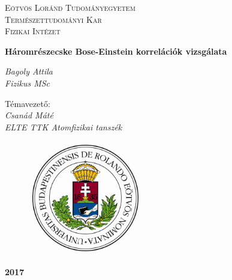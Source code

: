 \documentclass[10pt,a4paper]{article}
\title{}
\numberwithin{equation}{subsection}
\numberwithin{figure}{section}
\begin{document}
\pagestyle{empty}


\begin{titlepage}

\center

\textsc{\LARGE  Eötvös Loránd Tudományegyetem}\\[0.5cm]
\textsc{\LARGE Természettudományi Kar}\\[1.5cm]
\textsc{\LARGE Fizikai Intézet}\\[1.5cm]
\vspace{8mm}

{ \huge \bfseries Háromrészecske Bose-Einstein korrelációk vizsgálata}\\[0.4cm] %
\vspace{8mm}

\begin{center}
\LARGE \textit{Bagoly Attila}\\
\Large \textit{Fizikus MSc}\\
\end{center}

\begin{center}
\LARGE Témavezető: \\
\LARGE \textit{Csanád Máté}\\
\Large \textit{ELTE TTK Atomfizikai tanszék}\\
\end{center}
\vspace{4mm}



\begin{figure}[H] 
\centerline{ 
\includegraphics[height=5cm]{pic/ELTE_logo.png} 
} 
\end{figure}
\vspace{5mm}
\begin{Large}
\textbf{2017%
}
\end{Large}

\end{titlepage}
\end{document}
